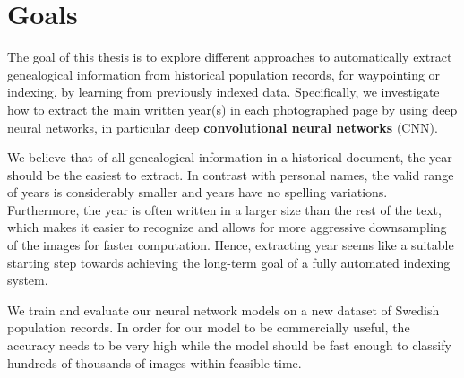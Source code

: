 \section{Goals}

The goal of this thesis is to explore different approaches to automatically extract genealogical information from historical population records, for waypointing or indexing, by learning from previously indexed data. Specifically, we investigate how to extract the main written year(s) in each photographed page by using deep neural networks, in particular deep \textbf{convolutional neural networks} (CNN).

We believe that of all genealogical information in a historical document, the year should be the easiest to extract.
In contrast with personal names, the valid range of years is considerably smaller and years have no spelling variations. Furthermore, the year is often written in a larger size than the rest of the text, which makes it easier to recognize and allows for more aggressive downsampling of the images for faster computation.
Hence, extracting year seems like a suitable starting step towards achieving the long-term goal of a fully automated indexing system.



We train and evaluate our neural network models on a new dataset of Swedish population records.
In order for our model to be commercially useful, the accuracy needs to be very high while the model should be fast enough to classify hundreds of thousands of images within feasible time.



